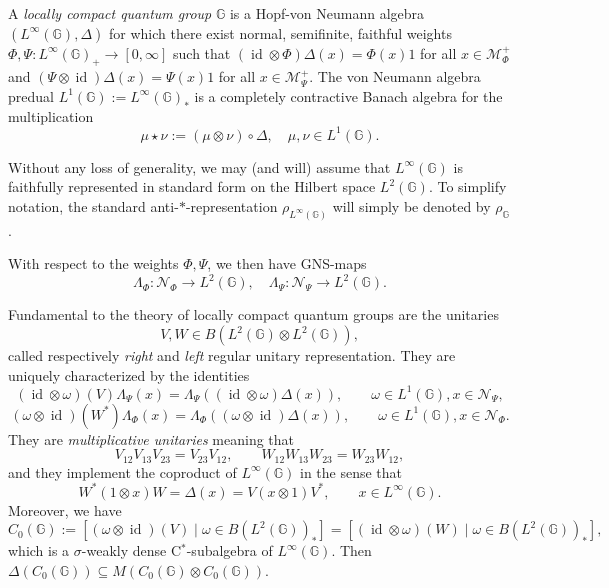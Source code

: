 \documentclass[reqno]{amsart}
\numberwithin{equation}{section}
\DeclareMathOperator{\id}{\mathrm{id}}
\newcommand{\msN}{\mathscr{N}}
\newcommand{\G}{\mathbb{G}}
\begin{document}
A \emph{locally compact quantum group} \cites{KV00, KV03,VV03} $\G$ is a Hopf-von Neumann algebra $(L^\infty(\G), \Delta)$ for which there exist normal, semifinite, faithful weights $\Phi, \Psi: L^\infty(\G)_+\to [0, \infty]$ such that $(\id\otimes \Phi)\Delta(x)= \Phi(x)1$ for all $x\in \mathscr{M}_\Phi^+$ and $(\Psi\otimes \id)\Delta(x)= \Psi(x)1$ for all $x\in \mathscr{M}_\Psi^+$. The von Neumann algebra predual $L^1(\G):= L^\infty(\G)_*$ is a completely contractive Banach algebra for the multiplication 
$$\mu\star \nu:= (\mu\otimes \nu)\circ \Delta, \quad \mu, \nu \in L^1(\G).$$

Without any loss of generality, we may (and will) assume that $L^\infty(\G)$ is faithfully represented in standard form on the Hilbert space $L^2(\G)$. To simplify notation, the standard anti-$*$-representation $\rho_{L^\infty(\G)}$ will simply be denoted by $\rho_\G$.

With respect to the weights $\Phi, \Psi$, we then have GNS-maps
$$\Lambda_\Phi: \mathscr{N}_\Phi\to L^2(\G), \quad \Lambda_\Psi: \mathscr{N}_\Psi\to L^2(\G).$$

Fundamental to the theory of locally compact quantum groups are the unitaries 
\[
V,W \in B(L^2(\G)\otimes L^2(\G)),
\]
called respectively \emph{right} and \emph{left} regular unitary representation. They are uniquely characterized by the identities 
\[
(\id\otimes \omega)(V) \Lambda_{\Psi}(x) = \Lambda_{\Psi}((\id\otimes \omega)\Delta(x)),
\qquad \omega \in L^1(\G),x\in \msN_{\Psi},
\]
\[
 (\omega \otimes \id)(W^*)\Lambda_{\Phi}(x) = \Lambda_{\Phi}((\omega\otimes \id)\Delta(x)),\qquad \omega \in L^1(\G),x\in \msN_{\Phi}.
\]
They are \emph{multiplicative unitaries} \cite{BS93} meaning that
\[
V_{12}V_{13}V_{23} = V_{23}V_{12},\qquad W_{12}W_{13}W_{23}= W_{23}W_{12},
\]
and they implement the coproduct of $L^\infty(\G)$ in the sense that
$$\label{EqComultImpl}
W^*(1\otimes x)W = \Delta(x) = V(x\otimes 1)V^*,\qquad x\in L^\infty(\G).$$
Moreover, we have
$$C_0(\G):=[(\omega\otimes \id)(V) \mid \omega \in B(L^2(\G))_*] = [(\id\otimes \omega)(W) \mid \omega \in B(L^2(\G))_*],$$
which is a $\sigma$-weakly dense C$^*$-subalgebra of $L^\infty(\G)$. Then $\Delta(C_0(\G))\subseteq M(C_0(\G)\otimes C_0(\G))$. 
\end{document}

